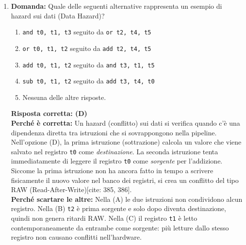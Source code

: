 \documentclass[12pt, a4paper]{article}
\begin{document}
\begin{enumerate}
    \textbf{Risposta corretta: (A)} \\
    \textbf{Perché è corretta:} La domanda chiede di individuare l'affermazione palesemente scorretta. Per definizione hardware, una rete logica combinatoria è "senza memoria". Questo significa che i valori delle sue uscite dipendono \textit{esclusivamente} e puramente dalla combinazione attuale degli ingressi in quello stesso istante[cite: 351, 352]. Non avendo memoria interna, il circuito combinatorio non possiede un concetto di "stato", pertanto affermare che la sua uscita dipenda dallo stato è radicalmente falso. \\
    \textbf{Perché scartare le altre:} Le affermazioni in (B), (C) e (D) descrivono invece concetti validi e veri. I circuiti sequenziali calcolano la loro uscita elaborando sia gli ingressi attuali sia la loro memoria (il loro stato), mentre i combinatori si basano rigorosamente solo sull'ingresso.

    \item \textbf{Domanda:} Quale delle seguenti alternative rappresenta un esempio di hazard sui dati (Data Hazard)?
    \begin{enumerate}[label=(\Alph*)]
        \item \texttt{and t0, t1, t3} seguito da \texttt{or t2, t4, t5}
        \item \texttt{or t0, t1, t2} seguito da \texttt{add t2, t4, t5}
        \item \texttt{add t0, t1, t2} seguito da \texttt{and t3, t1, t5}
        \item \texttt{sub t0, t1, t2} seguito da \texttt{add t3, t4, t0}
        \item Nessuna delle altre risposte.
    \end{enumerate}
    \textbf{Risposta corretta: (D)} \\
    \textbf{Perché è corretta:} Un hazard (conflitto) sui dati si verifica quando c'è una dipendenza diretta tra istruzioni che si sovrappongono nella pipeline. Nell'opzione (D), la prima istruzione (sottrazione) calcola un valore che viene salvato nel registro \texttt{t0} come \textit{destinazione}. La seconda istruzione tenta immediatamente di leggere il registro \texttt{t0} come \textit{sorgente} per l'addizione. Siccome la prima istruzione non ha ancora fatto in tempo a scrivere fisicamente il nuovo valore nel banco dei registri, si crea un conflitto del tipo RAW (Read-After-Write)[cite: 385, 386]. \\
    \textbf{Perché scartare le altre:} Nella (A) le due istruzioni non condividono alcun registro. Nella (B) \texttt{t2} è prima sorgente e solo dopo diventa destinazione, quindi non genera ritardi RAW. Nella (C) il registro \texttt{t1} è letto contemporaneamente da entrambe come sorgente: più letture dallo stesso registro non causano conflitti nell'hardware.


\end{enumerate}
\end{document}
